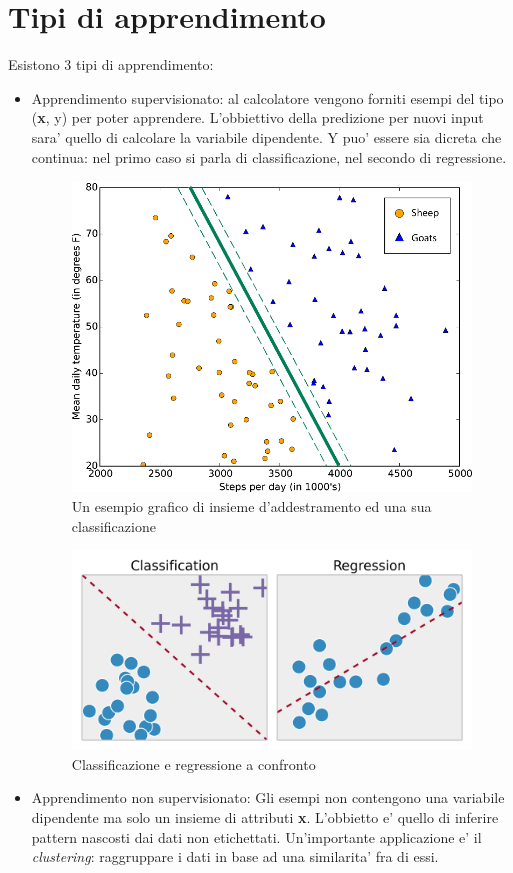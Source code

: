 \section{Tipi di apprendimento}
Esistono 3 tipi di apprendimento:
\begin{itemize}
	\item Apprendimento supervisionato: al calcolatore vengono forniti esempi del tipo (\textbf{x}, y) per poter apprendere. L'obbiettivo della predizione per nuovi input sara' quello di calcolare la variabile dipendente. Y puo' essere sia dicreta che continua: nel primo caso si parla di classificazione, nel secondo di regressione.
	
	
	\begin{figure}[H]
		\centering
		\includegraphics[width=0.7\linewidth]{img/supervised_learning_example}
		\caption{Un esempio grafico di insieme d'addestramento ed una sua classificazione}
		\label{fig:supervisedlearningexample}
	\end{figure}
	
	
	\begin{figure}[H]
		\centering
		\includegraphics[width=0.7\linewidth]{img/Classification_Regression}
		\caption{Classificazione e regressione a confronto}
		\label{fig:classificationregression}
	\end{figure}

	\item Apprendimento non supervisionato: Gli esempi non contengono una variabile dipendente ma solo un insieme di attributi \textbf{x}. L'obbietto e' quello di inferire pattern nascosti dai dati non etichettati. Un'importante applicazione e' il \textit{clustering}: raggruppare i dati in base ad una similarita' fra di essi.
	

\end{itemize}
